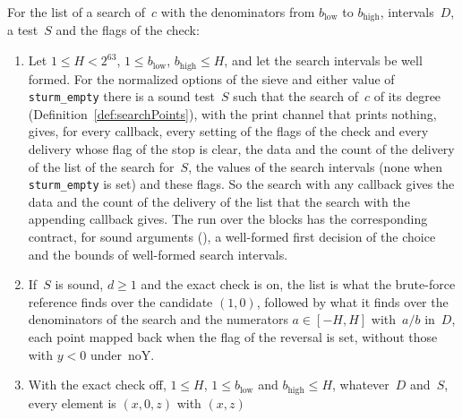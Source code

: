 \begin{lemma}\label{lem:searchList}
  \leanok
  For the list of a search of~$c$ with the denominators from $b_{\mathrm{low}}$ to
  $b_{\mathrm{high}}$, intervals~$D$, a test~$S$ and the flags of the check:
  \begin{enumerate}
    \item Let $1 \le H < 2^{63}$, $1 \le b_{\mathrm{low}}$, $b_{\mathrm{high}} \le H$, and let the
      search intervals be well formed. For the normalized options of the sieve and either value of
      \verb|sturm_empty| there is a sound test~$S$ such that the search of~$c$ of its degree
      (Definition~\ref{def:searchPoints}), with the print channel that prints nothing, gives, for
      every callback, every setting of the flags of the check and every delivery whose flag of the
      stop is clear, the data and the count of the delivery of the list of the search for~$S$, the
      values of the search intervals (none when \verb|sturm_empty| is set) and these flags. So the
      search with any callback gives the data and the count of the delivery of the list that the
      search with the appending callback gives. The run over the blocks has the corresponding
      contract, for sound arguments (), a well-formed first
      decision of the choice and the bounds of well-formed search intervals.
    \item If~$S$ is sound, $d \ge 1$ and the exact check is on, the list is what the brute-force
      reference finds over the candidate $(1, 0)$, followed by what it finds over the denominators
      of the search and the numerators $a \in [-H, H]$ with~$a/b$ in~$D$, each point mapped back
      when the flag of the reversal is set, without those with $y < 0$ under~$\mathrm{noY}$.
    \item With the exact check off, $1 \le H$, $1 \le b_{\mathrm{low}}$ and
      $b_{\mathrm{high}} \le H$, whatever~$D$ and~$S$, every element is $(x, 0, z)$ with $(x, z)$

\end{enumerate}
\end{lemma}
